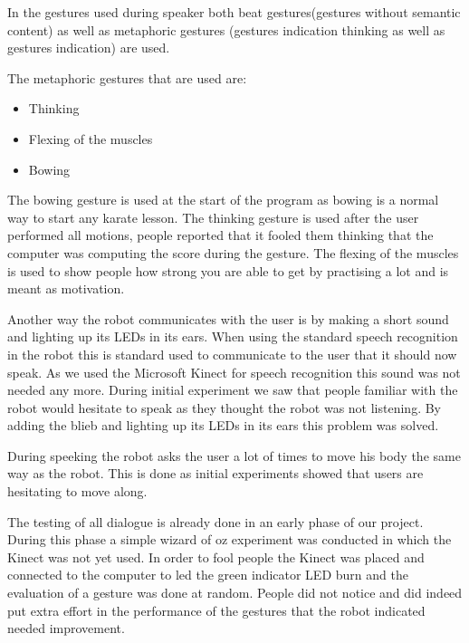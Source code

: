 \documentclass[10pt,a4paper,oneside]{scrartcl}
\begin{document}
In the gestures used during speaker both beat gestures(gestures without semantic content) as well as metaphoric gestures (gestures indication thinking as well as gestures indication) are used. 

The metaphoric gestures that are used are:
\begin{itemize}
  \item Thinking
  \item Flexing of the muscles
  \item Bowing
\end{itemize}

The bowing gesture is used at the start of the program as bowing is a normal way to start any karate lesson. 
The thinking gesture is used after the user performed all motions, people reported that it fooled them thinking that the computer was computing the score during the gesture. 
The flexing of the muscles is used to show people how strong you are able to get by practising a lot and is meant as motivation. 

Another way the robot communicates with the user is by making a short sound and lighting up its LEDs in its ears. 
When using the standard speech recognition in the robot this is standard used to communicate to the user that it should now speak. 
As we used the Microsoft Kinect for speech recognition this sound was not needed any more. 
During initial experiment we saw that people familiar with the robot would hesitate to speak as they thought the robot was not listening. 
By adding the blieb and lighting up its LEDs in its ears this problem was solved. 

During speeking the robot asks the user a lot of times to move his body the same way as the robot. 
This is done as initial experiments showed that users are hesitating to move along. 

The testing of all dialogue is already done in an early phase of our project. 
During this phase a simple wizard of oz experiment was conducted in which the Kinect was not yet used. 
In order to fool people the Kinect was placed and connected to the computer to led the green indicator LED burn and the evaluation of a gesture was done at random. 
People did not notice and did indeed put extra effort in the performance of the gestures that the robot indicated needed improvement. 
\end{document}
